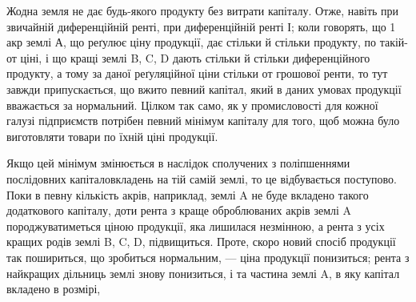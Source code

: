 Жодна земля не дає будь-якого продукту без витрати капіталу. Отже,
навіть при звичайній диференційній ренті, при диференційній ренті І; коли говорять,
що 1 акр землі А, що реґулює ціну продукції, дає стільки й стільки продукту,
по такій-от ціні, і що кращі землі B, C, D дають стільки й стільки диференційного
продукту, а тому за даної реґуляційної ціни стільки от грошової ренти, то
тут завжди припускається, що вжито певний капітал, який в даних умовах продукції
вважається за нормальний. Цілком так само, як у промисловості для
кожної галузі підприємств потрібен певний мінімум капіталу для того, щоб
можна було виготовляти товари по їхній ціні продукції.

Якщо цей мінімум змінюється в наслідок сполучених з поліпшеннями послідовних
капіталовкладень на тій самій землі, то це відбувається поступово.
Поки в певну кількість акрів, наприклад, землі A не буде вкладено такого додаткового
капіталу, доти рента з краще оброблюваних акрів землі A породжуватиметься
ціною продукції, яка лишилася незмінною, а рента з усіх кращих родів землі
B, C, D, підвищиться. Проте, скоро новий спосіб продукції так пошириться, що
зробиться нормальним, — ціна продукції понизиться; рента з найкращих дільниць
землі знову понизиться, і та частина землі A, в яку капітал вкладено в розмірі,
